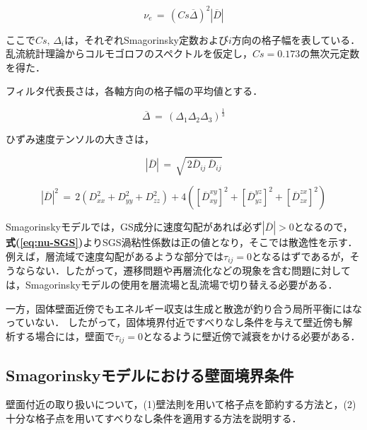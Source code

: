 \begin{equation}
\nu_e \,=\, \left( Cs \overline{\Delta} \right)^2 \left| \overline{D} \right|
\label{eq:nu-SGS}
\end{equation}

\noindent ここで$Cs,\,\Delta_{i}$は，それぞれSmagorinsky定数および$i$方向の格子幅を表している．
乱流統計理論からコルモゴロフのスペクトルを仮定し，$Cs=0.173$の無次元定数を得た．

フィルタ代表長さは，各軸方向の格子幅の平均値とする．

\begin{equation}
\overline{\Delta} \,=\, \left( {
\Delta_1 \Delta_2 \Delta_3
} \right)^{\frac{1}{3}}
\label{eq:SGS-delta}
\end{equation}

ひずみ速度テンソルの大きさは，

\begin{equation}
\left| \overline{D} \right| \,=\, \sqrt{\,2 \overline{D}_{ij} \, \overline{D}_{ij}}
\label{eq:SGS-S}
\end{equation}

\begin{equation}
{\left| \overline{D} \right|}^2 \,=\, 
2 \left( { D_{xx}^2 + D_{yy}^2 + D_{zz}^2 } \right)
+ 4 \left( 
  \left[ \overline{D}_{xy}^{xy} \right]^2 
+ \left[ \overline{D}_{yz}^{yz} \right]^2 
+ \left[ \overline{D}_{zx}^{zx} \right]^2 \right)
\label{eq:SGS-S2}
\end{equation}



Smagorinskyモデルでは，GS成分に速度勾配があれば必ず$\left| \overline{D} \right| > 0$となるので，\textbf{式(\ref{eq:nu-SGS})}よりSGS渦粘性係数は正の値となり，そこでは散逸性を示す．例えば，層流域で速度勾配があるような部分では$\tau_{ij}=0$となるはずであるが，そうならない．したがって，遷移問題や再層流化などの現象を含む問題に対しては，Smagorinskyモデルの使用を層流場と乱流場で切り替える必要がある．

一方，固体壁面近傍でもエネルギー収支は生成と散逸が釣り合う局所平衡にはなっていない．
したがって，固体境界付近ですべりなし条件を与えて壁近傍も解析する場合には，壁面で$\tau_{ij}=0$となるように壁近傍で減衰をかける必要がある．

%
\subsection{Smagorinskyモデルにおける壁面境界条件}
壁面付近の取り扱いについて，(1)壁法則を用いて格子点を節約する方法と，(2)十分な格子点を用いてすべりなし条件を適用する方法を説明する．

